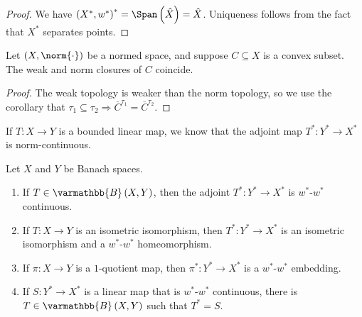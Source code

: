 \documentclass[10pt]{mypackage}
\renewcommand*{\mathbb}[1]{\varmathbb{#1}}
\newcommand{\B}{\mathbb{B}}
\begin{document}
\begin{proof}
  We have $\left(X^{\ast},w^{\ast}\right)^{\ast} = \Span\left(\hat{X}\right) = \hat{X}$. Uniqueness follows from the fact that $X^{\ast}$ separates points.
\end{proof}
\begin{theorem}
  Let $\left(X,\norm{\cdot}\right)$ be a normed space, and suppose $C\subseteq X$ is a convex subset. The weak and norm closures of $C$ coincide.
\end{theorem}
\begin{proof}
  The weak topology is weaker than the norm topology, so we use the corollary that $\tau_1\subseteq \tau_2 \Rightarrow \overline{C}^{\tau_1} = \overline{C}^{\tau_2}$.
\end{proof}
If $T:X\rightarrow Y$ is a bounded linear map, we know that the adjoint map $T^{\ast}: Y^{\ast}\rightarrow X^{\ast}$ is norm-continuous.
\begin{lemma}
  Let $X$ and $Y$ be Banach spaces.
  \begin{enumerate}[(1)]
    \item If $T\in \B\left(X,Y\right)$, then the adjoint $T^{\ast}:Y^{\ast}\rightarrow X^{\ast}$ is $w^{\ast}$-$w^{\ast}$ continuous.
    \item If $T: X\rightarrow Y$ is an isometric isomorphism, then $T^{\ast}:Y^{\ast}\rightarrow X^{\ast}$ is an isometric isomorphism and a $w^{\ast}$-$w^{\ast}$ homeomorphism.
    \item If $\pi: X\rightarrow Y$ is a $1$-quotient map, then $\pi^{\ast}:Y^{\ast}\rightarrow X^{\ast}$ is a $w^{\ast}$-$w^{\ast}$ embedding.
    \item If $S: Y^{\ast}\rightarrow X^{\ast}$ is a linear map that is $w^{\ast}$-$w^{\ast}$ continuous, there is $T\in \B\left(X,Y\right)$ such that $T^{\ast} = S$.
  \end{enumerate}
\end{lemma}
\end{document}
